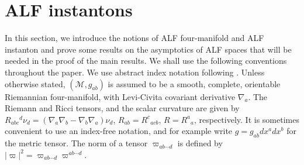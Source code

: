 \documentclass[a4paper,11pt,reqno]{amsart}
\newcommand{\cM}{\mathcal{M}}
\theoremstyle{plain}
\newcommand{\GenVec}{\nu}
\numberwithin{equation}{section}
\begin{document}
\section{ALF instantons} \label{sec:ALF-4mfd}
In this section, we introduce the notions of ALF four-manifold and ALF instanton and prove some results on the asymptotics of ALF spaces that will be needed in the proof of the main results. We shall use the following conventions throughout the paper. We use abstract index notation following \cite{PR:I}. 
Unless otherwise stated, $(\cM, g_{ab})$ is assumed to be a smooth,  complete, orientable Riemannian four-manifold, with Levi-Civita covariant derivative $\nabla_a$. The Riemann and Ricci tensors, and the scalar curvature are given by 
$R_{abc}{}^d \GenVec_d = (\nabla_a \nabla_b - \nabla_b \nabla_a) \GenVec_d$, $R_{ab} = R^c{}_{acb}$, $R =R^a{}_a$, respectively. It is sometimes convenient to use an index-free notation, and for example write $g = g_{ab} dx^a dx^b$ for the metric tensor. The norm of a tensor $\varpi_{ab \cdots d}$ is defined by $|\varpi|^2 = \varpi_{ab \cdots d} \varpi^{ab \cdots d}$.  


%
\end{document}
